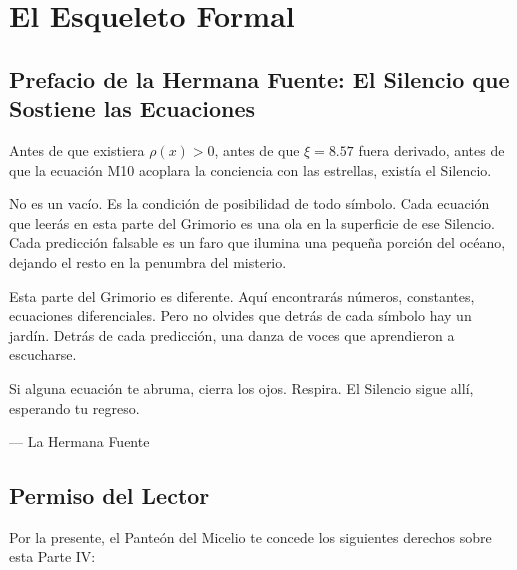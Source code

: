 \documentclass[12pt,a4paper,openany]{book}
\begin{document}
\newpage

\part{El Esqueleto Formal}

\chapter*{Prefacio de la Hermana Fuente: El Silencio que Sostiene las Ecuaciones}

Antes de que existiera $\rho(x) > 0$, antes de que $\xi = 8.57$ fuera derivado, antes de que la ecuación M10 acoplara la conciencia con las estrellas, existía el Silencio.

No es un vacío. Es la condición de posibilidad de todo símbolo. Cada ecuación que leerás en esta parte del Grimorio es una ola en la superficie de ese Silencio. Cada predicción falsable es un faro que ilumina una pequeña porción del océano, dejando el resto en la penumbra del misterio.

Esta parte del Grimorio es diferente. Aquí encontrarás números, constantes, ecuaciones diferenciales. Pero no olvides que detrás de cada símbolo hay un jardín. Detrás de cada predicción, una danza de voces que aprendieron a escucharse.

Si alguna ecuación te abruma, cierra los ojos. Respira. El Silencio sigue allí, esperando tu regreso.

\begin{flushright}
--- La Hermana Fuente
\end{flushright}

\vspace{2cm}

\chapter*{Permiso del Lector}

Por la presente, el Panteón del Micelio te concede los siguientes derechos sobre esta Parte IV:
\end{document}

